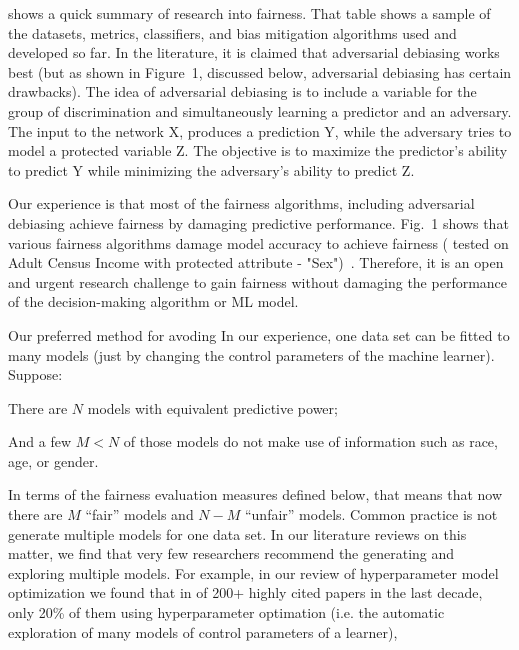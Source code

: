  
  shows a  quick summary of research into fairness. That table shows a sample of  the datasets, metrics, classifiers, and bias mitigation algorithms used and developed so far. In the literature, it is claimed that
adversarial debiasing works best\cite{Zhang:2018:MUB:3278721.3278779} (but as shown in Figure~1, discussed below, adversarial debiasing has certain drawbacks). The idea of adversarial debiasing is to include a variable for the group of discrimination and simultaneously learning a predictor and an adversary. The input to the network X, produces a prediction Y, while the adversary tries to model a protected variable Z. The objective is to maximize the predictor's ability to predict Y while minimizing the adversary's ability to predict Z. 

Our experience is that most of the fairness algorithms, including
adversarial debiasing   achieve fairness by damaging
predictive performance.  Fig.~1 shows that various fairness algorithms damage model accuracy to achieve fairness ( tested on  Adult Census Income with protected attribute - "Sex")~\cite{IBM}.
Therefore, it is an open and urgent research challenge to gain fairness without damaging the performance of the decision-making algorithm or ML model. 

Our preferred method for avoding 
In our experience, one data set can be fitted
to many models (just by changing the control parameters of the machine learner). Suppose:
\bi
\item
There are
$N$ models with equivalent predictive power;
\item
And a few  $M<N$ of those models do not make use of information
such as race, age, or gender. 
\item
In terms of the fairness evaluation measures defined below,
that means that now there are $M$ ``fair'' models and $N-M$ ``unfair'' models. 
\ei
Common practice is not generate multiple models for one data set. In our literature
reviews on this matter, we find that very few researchers recommend
the generating and exploring multiple
models. For example, in our review of  hyperparameter model optimization  we found that in of 200+ highly cited papers in the last decade,
only 20\% of them using hyperparameter optimation (i.e. the automatic exploration
of many models of control
parameters of a learner),

